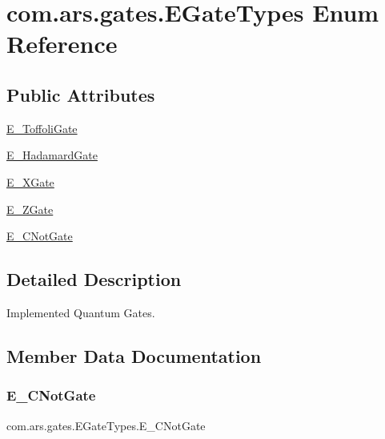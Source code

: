 \hypertarget{enumcom_1_1ars_1_1gates_1_1_e_gate_types}{}\section{com.\+ars.\+gates.\+E\+Gate\+Types Enum Reference}
\label{enumcom_1_1ars_1_1gates_1_1_e_gate_types}
\subsection*{Public Attributes}
\begin{DoxyCompactItemize}
\item 
\hyperlink{enumcom_1_1ars_1_1gates_1_1_e_gate_types_a374b473babbd584c22f80e6552064234}{E\+\_\+\+Toffoli\+Gate}
\item 
\hyperlink{enumcom_1_1ars_1_1gates_1_1_e_gate_types_abeb9ade3d4c04006200df8d2df685e67}{E\+\_\+\+Hadamard\+Gate}
\item 
\hyperlink{enumcom_1_1ars_1_1gates_1_1_e_gate_types_a4a07af93612467257717239122a1c03a}{E\+\_\+\+X\+Gate}
\item 
\hyperlink{enumcom_1_1ars_1_1gates_1_1_e_gate_types_ae9bf7c54ade9d79260e750bda4aec249}{E\+\_\+\+Z\+Gate}
\item 
\hyperlink{enumcom_1_1ars_1_1gates_1_1_e_gate_types_a921ebe3d6405141a79ae014d94445d48}{E\+\_\+\+C\+Not\+Gate}
\end{DoxyCompactItemize}


\subsection{Detailed Description}
Implemented Quantum Gates. 

\subsection{Member Data Documentation}
\hypertarget{enumcom_1_1ars_1_1gates_1_1_e_gate_types_a921ebe3d6405141a79ae014d94445d48}{}\label{enumcom_1_1ars_1_1gates_1_1_e_gate_types_a921ebe3d6405141a79ae014d94445d48} 
\subsubsection{\texorpdfstring{E\+\_\+\+C\+Not\+Gate}{E\_CNotGate}}
{\footnotesize\ttfamily com.\+ars.\+gates.\+E\+Gate\+Types.\+E\+\_\+\+C\+Not\+Gate}

